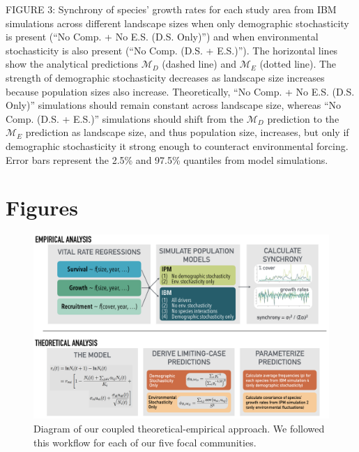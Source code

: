 \documentclass[12pt,]{article}
\begin{document}
FIGURE 3: Synchrony of species' growth rates for each study area from IBM simulations across different landscape sizes when only demographic stochasticity is present (``No Comp. + No E.S. (D.S. Only)'') and when environmental stochasticity is also present (``No Comp. (D.S. + E.S.)''). The horizontal lines show the analytical predictions $\mathcal{M}_D$ (dashed line) and $\mathcal{M}_E$ (dotted line). The strength of demographic stochasticity decreases as landscape size increases because population sizes also increase. Theoretically, ``No Comp. + No E.S. (D.S. Only)'' simulations should remain constant across landscape size, whereas ``No Comp. (D.S. + E.S.)'' simulations should shift from the $\mathcal{M}_D$ prediction to the $\mathcal{M}_E$ prediction as landscape size, and thus population size, increases, but only if demographic stochasticity it strong enough to counteract environmental forcing. Error bars represent the 2.5\% and 97.5\% quantiles from model simulations.


\pagebreak{}

\section{Figures}

\begin{figure}[!ht]
  \centering
      \includegraphics[width=6in]{./components/formatted_figures/synchrony_flowchart_bw.png}
  \caption{Diagram of our coupled theoretical-empirical approach. We followed this workflow for each of our five focal communities.}
\end{figure}

\pagebreak{}
\end{document}
